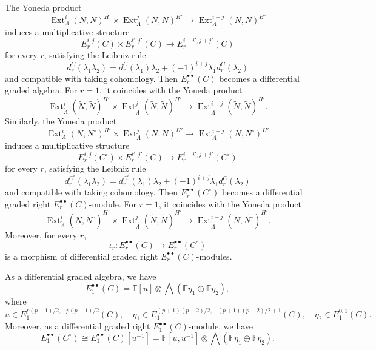 \documentclass[11pt,a4paper]{article} %
\def\FF{\mathbb{F}}
\def\Ext{\operatorname{Ext}} %
\begin{document}
The Yoneda product
\[
\Ext^i_{\Lambda}(N,N)^{H'}\times\Ext^j_{\Lambda}(N,N)^{H'}\longrightarrow\Ext^{i+j}_{\Lambda}(N,N)^{H'}
\]
induces a multiplicative structure
\[
E_r^{i,j}(C)\times E_r^{i',j'}(C)\longrightarrow E_r^{i+i',j+j'}(C)
\]
for every $r$, satisfying the Leibniz rule
\[
d_r^C(\lambda_1\lambda_2)=d_r^C(\lambda_1)\lambda_2+(-1)^{i+j}\lambda_1d_r^C(\lambda_2)
\]
and compatible with taking cohomology. Then $E_r^{\bullet\bullet}(C)$ becomes a differential graded algebra. For $r=1$, it coincides with the Yoneda product
\[
\Ext^i_{\widetilde{\Lambda}}(\widetilde{N},\widetilde{N})^{H'}\times\Ext^j_{\widetilde{\Lambda}}(\widetilde{N},\widetilde{N})^{H'}\longrightarrow\Ext^{i+j}_{\widetilde{\Lambda}}(\widetilde{N},\widetilde{N})^{H'}.
\]
Similarly, the Yoneda product
\[
\Ext^i_{\Lambda}(N,N^\circ)^{H'}\times\Ext^j_{\Lambda}(N,N)^{H'}\longrightarrow\Ext^{i+j}_{\Lambda}(N,N^\circ)^{H'}
\]
induces a multiplicative structure
\[
E_r^{i,j}(C^\circ)\times E_r^{i',j'}(C)\longrightarrow E_r^{i+i',j+j'}(C^\circ)
\]
for every $r$, satisfying the Leibniz rule
\[
d_r^{C^\circ}(\lambda_1\lambda_2)=d_r^{C^\circ}(\lambda_1)\lambda_2+(-1)^{i+j}\lambda_1d_r^C(\lambda_2)
\]
and compatible with taking cohomology. Then $E_r^{\bullet\bullet}(C^\circ)$ becomes a differential graded right $E_r^{\bullet\bullet}(C)$-module. For $r=1$, it coincides with the Yoneda product
\[
\Ext^i_{\widetilde{\Lambda}}(\widetilde{N},\widetilde{N^\circ})^{H'}\times\Ext^j_{\widetilde{\Lambda}}(\widetilde{N},\widetilde{N})^{H'}\longrightarrow\Ext^{i+j}_{\widetilde{\Lambda}}(\widetilde{N},\widetilde{N^\circ})^{H'}.
\]
Moreover, for every $r$,
\[
\iota_r:E_r^{\bullet\bullet}(C)\longrightarrow E_r^{\bullet\bullet}(C^\circ)
\]
is a morphism of differential graded right $E_r^{\bullet\bullet}(C)$-modules.

\begin{lemma}\label{lem:E1-C}
As a differential graded algebra, we have
    \[
    E_1^{\bullet\bullet}(C)=\FF[u]\otimes\bigwedge(\FF\eta_1\oplus\FF\eta_2),
    \]
    where
    \[
    u\in E_1^{p(p+1)/2,-p(p+1)/2}(C),\quad\eta_1\in E_1^{(p+1)(p-2)/2,-(p+1)(p-2)/2+1}(C),\quad\eta_2\in E_1^{0,1}(C).
    \]
    Moreover, as a differential graded right $E_1^{\bullet\bullet}(C)$-module, we have
    \[
     E_1^{\bullet\bullet}(C^\circ)\cong E_1^{\bullet\bullet}(C)[u^{-1}]=\FF[u,u^{-1}]\otimes\bigwedge(\FF\eta_1\oplus\FF\eta_2).
    \]
\end{lemma}
\end{document}
